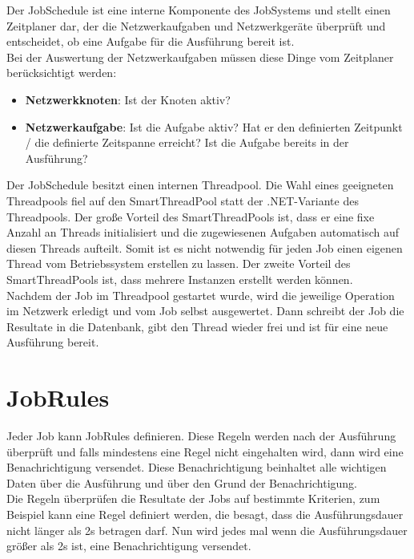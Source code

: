 \documentclass[12pt,a4paper]{report}
\begin{document}
\begin{onehalfspace}
Der JobSchedule ist eine interne Komponente des JobSystems und stellt einen Zeitplaner dar, der die Netzwerkaufgaben und Netzwerkgeräte überprüft und entscheidet, ob eine Aufgabe für die Ausführung bereit ist.\\
Bei der Auswertung der Netzwerkaufgaben müssen diese Dinge vom Zeitplaner berücksichtigt werden:

\begin{itemize}
\item \textbf{Netzwerkknoten}: Ist der Knoten aktiv?
\item \textbf{Netzwerkaufgabe}: Ist die Aufgabe aktiv? Hat er den definierten Zeitpunkt / die definierte Zeitspanne erreicht? Ist die Aufgabe bereits in der Ausführung?
\end{itemize}

Der JobSchedule besitzt einen internen Threadpool. Die Wahl eines geeigneten Threadpools fiel auf den SmartThreadPool statt der .NET-Variante des Threadpools. Der große Vorteil des SmartThreadPools ist, dass er eine fixe Anzahl an Threads initialisiert und die zugewiesenen Aufgaben automatisch auf diesen Threads aufteilt. Somit ist es nicht notwendig für jeden Job einen eigenen Thread vom Betriebssystem erstellen zu lassen. Der zweite Vorteil des SmartThreadPools ist, dass mehrere Instanzen erstellt werden können.\\
Nachdem der Job im Threadpool gestartet wurde, wird die jeweilige Operation im Netzwerk erledigt und vom Job selbst ausgewertet. Dann schreibt der Job die Resultate in die Datenbank, gibt den Thread wieder frei und ist
für eine neue Ausführung bereit.

\section{JobRules}

Jeder Job kann JobRules definieren. Diese Regeln werden nach der Ausführung überprüft und falls mindestens eine Regel nicht eingehalten wird, dann wird eine Benachrichtigung versendet. Diese Benachrichtigung beinhaltet alle wichtigen Daten über die Ausführung und über den Grund der Benachrichtigung.\\
Die Regeln überprüfen die Resultate der Jobs auf bestimmte Kriterien, zum Beispiel kann eine Regel definiert werden, die besagt, dass die Ausführungsdauer nicht länger als 2s betragen darf. Nun wird jedes mal wenn die Ausführungsdauer größer als 2s ist, eine Benachrichtigung versendet.\\


\end{onehalfspace}
\end{document}

